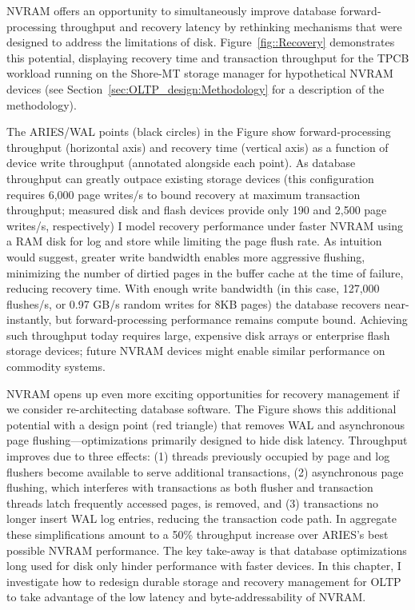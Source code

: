 NVRAM offers an opportunity to simultaneously improve database forward-processing throughput and recovery latency by rethinking mechanisms that were designed to address the limitations of disk.
Figure~\ref{fig::Recovery} demonstrates this potential, displaying recovery time and transaction throughput for the TPCB workload running on the Shore-MT storage manager \cite{JohnsonPandis09} for hypothetical NVRAM devices (see Section~\ref{sec:OLTP_design:Methodology} for a description of the methodology).



The ARIES/WAL points (black circles) in the Figure show forward-processing throughput (horizontal axis) and recovery time (vertical axis) as a function of device write throughput (annotated alongside each point).
As database throughput can greatly outpace existing storage devices (this configuration requires 6,000 page writes/s to bound recovery at maximum transaction throughput; measured disk and flash devices provide only 190 and 2,500 page writes/s, respectively) I model recovery performance under faster NVRAM using a RAM disk for log and store while limiting the page flush rate.
As intuition would suggest, greater write bandwidth enables more aggressive flushing, minimizing the number of dirtied pages in the buffer cache at the time of failure, reducing recovery time.
With enough write bandwidth (in this case, 127,000 flushes/s, or 0.97 GB/s random writes for 8KB pages) the database recovers near-instantly, but forward-processing performance remains compute bound.
Achieving such throughput today requires large, expensive disk arrays or enterprise flash storage devices; future NVRAM devices might enable similar performance on commodity systems.

NVRAM opens up even more exciting opportunities for recovery management if we consider re-architecting database software.
The Figure shows this additional potential with a design point (red triangle) that removes WAL and asynchronous page flushing---optimizations primarily designed to hide disk latency.
Throughput improves due to three effects: (1) threads previously occupied by page and log flushers become available to serve additional transactions, (2) asynchronous page flushing, which interferes with transactions as both flusher and transaction threads latch frequently accessed pages, is removed, and (3) transactions no longer insert WAL log entries, reducing the transaction code path.
In aggregate these simplifications amount to a 50\% throughput increase over ARIES's best possible NVRAM performance.
The key take-away is that database optimizations long used for disk only hinder performance with faster devices.
In this chapter, I investigate how to redesign durable storage and recovery management for OLTP to take advantage of the low latency and byte-addressability of NVRAM.

